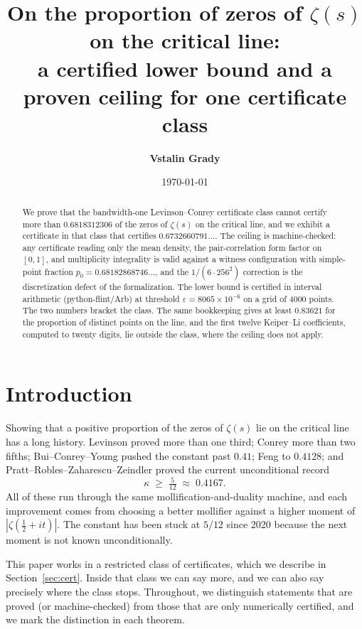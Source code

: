 \documentclass[11pt]{article}
\title{\bfseries On the proportion of zeros of $\zeta(s)$ on the critical line:\\ a certified lower bound and a proven ceiling for one certificate class}
\author{\textbf{Vstalin Grady}}
\date{\today}
\theoremstyle{remark}
\newcommand{\eps}{\varepsilon}
\newcommand{\Zeta}{\zeta}
\begin{document}
\maketitle

\begin{abstract}
We prove that the bandwidth-one Levinson--Conrey certificate class cannot certify
more than $0.6818312306$ of the zeros of $\Zeta(s)$ on the critical line, and we
exhibit a certificate in that class that certifies $0.6732660791\ldots$. The ceiling
is machine-checked: any certificate reading only the mean density, the
pair-correlation form factor on $[0,1]$, and multiplicity integrality is valid
against a witness configuration with simple-point fraction
$p_0=0.68182868746\ldots$, and the $1/(6\cdot256^2)$ correction is the
discretization defect of the formalization. The lower bound is certified in interval
arithmetic (python-flint/Arb) at threshold $\eps=8065\times10^{-6}$ on a grid of
$4000$ points. The two numbers bracket the class. The same bookkeeping gives at
least $0.83621$ for the proportion of distinct points on the line, and the first
twelve Keiper--Li coefficients, computed to twenty digits, lie outside the class,
where the ceiling does not apply.
\end{abstract}

\section{Introduction}

Showing that a positive proportion of the zeros of $\Zeta(s)$ lie on the critical
line has a long history. Levinson \cite{levinson} proved more than one third;
Conrey \cite{conrey} more than two fifths; Bui--Conrey--Young \cite{bcy} pushed the
constant past $0.41$; Feng \cite{feng} to $0.4128$; and
Pratt--Robles--Zaharescu--Zeindler \cite{przz} proved the current unconditional
record
\[
  \kappa \;\ge\; \tfrac{5}{12} \;\approx\; 0.4167 .
\]
All of these run through the same mollification-and-duality machine, and each
improvement comes from choosing a better mollifier against a higher moment of
$|\Zeta(\tfrac12+it)|$. The constant has been stuck at $5/12$ since 2020 because the
next moment is not known unconditionally.

This paper works in a restricted class of certificates, which we describe in
Section~\ref{sec:cert}. Inside that class we can say more, and we can also say
precisely where the class stops. Throughout, we distinguish statements that are
proved (or machine-checked) from those that are only numerically certified, and we
mark the distinction in each theorem.
\end{document}

